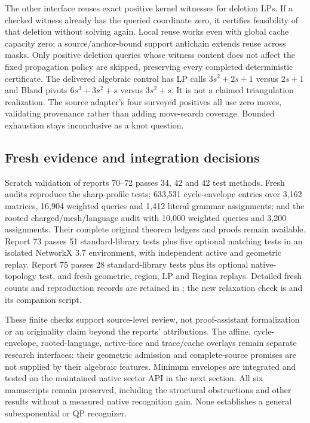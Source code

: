 The other interface reuses exact positive kernel witnesses for deletion LPs.
If a checked witness already has the queried coordinate zero, it certifies
feasibility of that deletion without solving again. Local reuse works even
with global cache capacity zero; a source/anchor-bound support antichain
extends reuse across masks. Only positive deletion queries whose witness
content does not affect the fixed propagation policy are skipped, preserving
every completed deterministic certificate. The delivered algebraic control
has LP calls $3s^2+2s+1$ versus $2s+1$ and Bland pivots
$6s^3+3s^2+s$ versus $3s^2+s$. It is not a claimed triangulation realization.
The source adapter's four surveyed positives all use zero moves, validating
provenance rather than adding move-search coverage. Bounded exhaustion stays
inconclusive as a knot question.

\subsection{Fresh evidence and integration decisions}

Scratch validation of reports 70--72 passes 34, 42 and 42 test methods.
Fresh audits reproduce the sharp-profile tests; 633,531 cycle-envelope
entries over 3,162 matrices, 16,904 weighted queries and 1,412 literal grammar
assignments; and the rooted charged/mesh/language audit with 10,000 weighted
queries and 3,200 assignments. Their complete original theorem ledgers and
proofs remain available. Report 73 passes 51 standard-library tests plus
five optional matching tests in an isolated NetworkX 3.7 environment, with
independent active and geometric replay. Report 75 passes 28 standard-library
tests plus its optional native-topology test, and fresh geometric, region,
LP and Regina replays. Detailed fresh counts and reproduction records are
retained in ; the new relaxation check is
 and its companion script.

These finite checks support source-level review, not proof-assistant
formalization or an originality claim beyond the reports' attributions.
The affine, cycle-envelope, rooted-language, active-face and trace/cache
overlays remain separate research interfaces: their geometric admission and
complete-source promises are not supplied by their algebraic features.
Minimum envelopes are integrated and tested on the maintained native sector
API in the next section. All six manuscripts remain preserved, including
the structural obstructions and other results without a measured native
recognition gain. None establishes a general subexponential or QP recognizer.
